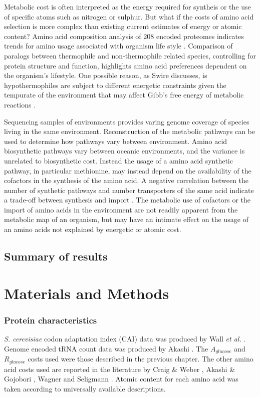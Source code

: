 Metabolic cost is often interpreted as the energy required for syntheis or the use of specific atoms such as nitrogen or sulphur. But what if the costs of amino acid selection is more complex than existing current estimates of energy or atomic content? Amino acid composition analysis of 208 encoded proteomes indicates trends for amino usage associated with organism life style \cite{tekaia}. Comparison of paralogs between thermophile and non-thermophile related species, controlling for protein structure and function, highlights amino acid preferences dependent on the organism's lifestyle. One possible reason, as Swire discusses, is hypothermophiles are subject to different energetic constraints given the tempurate of the environment that may affect Gibb's free energy of metabolic reactions \cite{swire2006}.

Sequencing samples of environments provides varing genome coverage of species living in the same environment. Reconstruction of the metabolic pathways can be used to determine how pathways vary between environment. Amino acid biosynthetic pathways vary between oceanic environments, and the variance is unrelated to biosynthetic cost. Instead the usage of a amino acid synthetic pathway, in particular methionine, may instead depend on the availability of the cofactors in the synthesis of the amino acid. A negative correlation between the number of synthetic pathways and number transporters of the same acid indicate a trade-off between synthesis and import \cite{gianoulis2009}. The metabolic use of cofactors or the import of amino acids in the environment are not readily apparent from the metabolic map of an organism, but may have an intimate effect on the usage of an amino acids not explained by energetic or atomic cost.

\subsection{Summary of results}

\clearpage

\section{Materials and Methods}

\subsubsection{Protein characteristics}

\emph{S. cerevisiae} codon adaptation index (CAI) data was produced by Wall \emph{et al.} \cite{wall2005}. Genome encoded tRNA count data was produced by Akashi \cite{akashi_trna}. The $A_{glucose}$ and $R_{glucose}$ costs used were those described in the previous chapter. The other amino acid costs used are reported in the literature by Craig \& Weber \cite{craig1998}, Akashi \& Gojobori \cite{akashi2002}, Wagner \cite{wagner2005} and Seligmann \cite{seligmann2004}. Atomic content for each amino acid was taken according to universally available descriptions.

